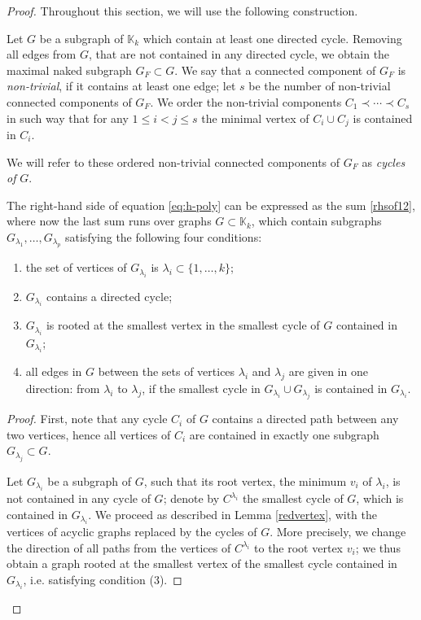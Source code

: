 \begin{proof}
Throughout this section, we will use the following construction. 

\begin{constr}[cycles]\label{construction:cycle} Let $G$ be a subgraph of $\mathbb{K}_k$ which contain at least one directed cycle. Removing all edges from $G$, that are not contained in any directed cycle, we obtain the maximal naked subgraph $G_F\subset G$. We say that a connected component of $G_F$ is \textit{non-trivial}, if it contains at least one edge; let $s$ be the number of non-trivial connected components of $G_F$. We order the non-trivial components $C_1\prec \cdots \prec C_s$ in such way that for any $1\leq i<j \leq s$ the minimal vertex of $C_i \cup C_j$ is contained in $C_i$. 
\end{constr}

\begin{nota}
We will refer to these ordered non-trivial connected components of $G_F$ as  \textit{cycles of} $G$.
\end{nota}

\begin{lemma}\label{conditions}
The right-hand side of equation \eqref{eq:h-poly} can be expressed as the sum \eqref{rhsof12}, where now the last sum runs over graphs $G\subset \mathbb{K}_k$, which contain subgraphs $G_{\lambda_1}, \ldots ,G_{\lambda_p}$ satisfying the following four conditions: 
\begin{enumerate}
\item the set of vertices of $G_{\lambda_i}$ is $\lambda_i\subset\{1, \ldots ,k\}$;
\item $G_{\lambda_i}$ contains a directed cycle;
\item $G_{\lambda_i}$ is rooted at the smallest vertex  in the smallest cycle of $G$ contained in $ G_{\lambda_i}$;
\item all edges in $G$ between the sets of vertices $\lambda_i$ and $\lambda_j$ are given in one direction: from $\lambda_i$ to $\lambda_j$, if the smallest cycle in $G_{\lambda_i}\cup G_{\lambda_j}$ is contained in $G_{\lambda_i}$.
\end{enumerate} 
\end{lemma}
\begin{proof}
First, note that any cycle $C_i$ of $G$ contains a directed path between any two vertices, hence all vertices of $C_i$ are contained in exactly one subgraph $G_{\lambda_j}\subset G$. 
 
Let $G_{\lambda_i}$ be a subgraph of $G$, such that its root vertex, the 
minimum $v_i$ of $\lambda_i$, is not contained in any cycle of $G$; denote by 
$C^{\lambda_{i}}$ the smallest cycle of $G$, which is contained in 
$G_{\lambda_i}$. We proceed as described in Lemma \ref{redvertex}, with the 
vertices of acyclic graphs replaced by the cycles of $G$. 
More precisely, we change the direction of all paths from the vertices of 
$C^{\lambda_{i}}$ to the root vertex $v_i$; we thus obtain a graph rooted at 
the smallest vertex of the smallest cycle contained in $ G_{\lambda_i}$, i.e.  
satisfying condition (3).


\end{proof}
\end{proof}
